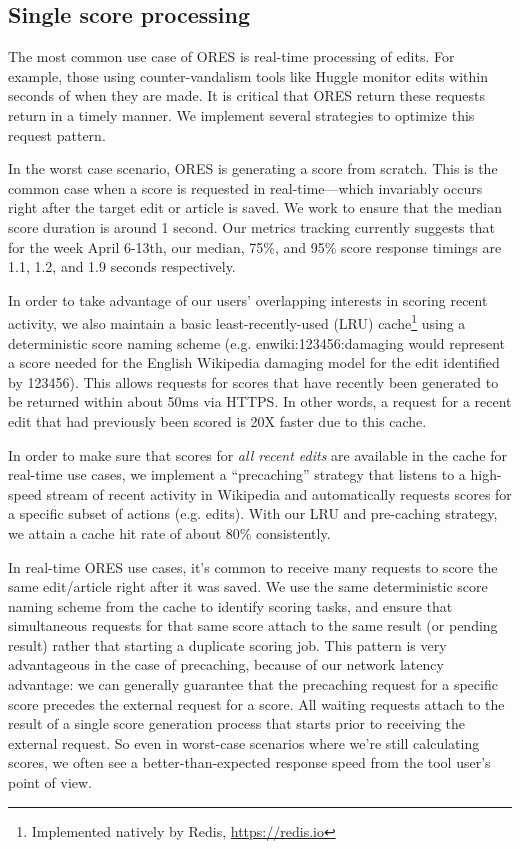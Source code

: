 \subsection{Single score processing}
The most common use case of ORES is real-time processing of edits.  For example, those using counter-vandalism tools like Huggle monitor edits within seconds of when they are made.  It is critical that ORES return these requests return in a timely manner.  We implement several strategies to optimize this request pattern.

In the worst case scenario, ORES is generating a score from scratch.  This is the common case when a score is requested in real-time---which invariably occurs right after the target edit or article is saved.  We work to ensure that the median score duration is around 1 second.  Our metrics tracking currently suggests that for the week April 6-13th, our median, 75\%, and 95\% score response timings are 1.1, 1.2, and 1.9 seconds respectively.

In order to take advantage of our users' overlapping interests in scoring recent activity, we also maintain a basic least-recently-used (LRU) cache\footnote{Implemented natively by Redis, \url{https://redis.io}} using a deterministic score naming scheme (e.g. enwiki:123456:damaging would represent a score needed for the English Wikipedia damaging model for the edit identified by 123456).  This allows requests for scores that have recently been generated to be returned within about 50ms via HTTPS.  In other words, a request for a recent edit that had previously been scored is 20X faster due to this cache.

In order to make sure that scores for \emph{all recent edits} are available in the cache for real-time use cases, we implement a ``precaching'' strategy that listens to a high-speed stream of recent activity in Wikipedia and automatically requests scores for a specific subset of actions (e.g. edits).  With our LRU and pre-caching strategy, we attain a cache hit rate of about 80\% consistently.

In real-time ORES use cases, it's common to receive many requests to score the same edit/article right after it was saved.  We use the same deterministic score naming scheme from the cache to identify scoring tasks, and ensure that simultaneous requests for that same score attach to the same result (or pending result) rather that starting a duplicate scoring job.  This pattern is very advantageous in the case of precaching, because of our network latency advantage: we can generally guarantee that the precaching request for a specific score precedes the external request for a score.  All waiting requests attach to the result of a single score generation process that starts prior to receiving the external request.  So even in worst-case scenarios where we're still calculating scores, we often see a better-than-expected response speed from the tool user's point of view.

